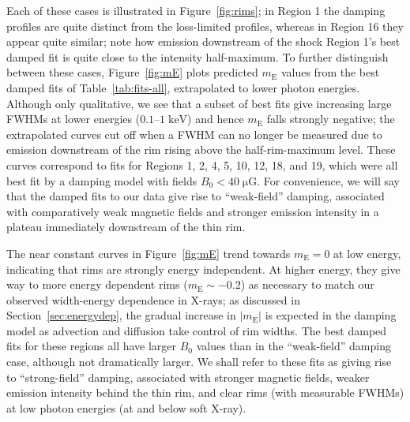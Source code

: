 \documentclass[iop, apj, numberedappendix]{emulateapj}
\newcommand*{\mt}{\mathrm}
\newcommand*{\unit}[1]{\;\mt{#1}}  %
\newcommand*{\mE}{m_\mt{E}}
\newcommand*{\muG}{\unit{\mu G}}
\begin{document}
Each of these cases is illustrated in Figure~\ref{fig:rims}; in Region 1 the
damping profiles are quite distinct from the loss-limited profiles, whereas in
Region 16 they appear quite similar; note how emission downstream of the shock
Region 1's best damped fit is quite close to the intensity half-maximum.  To
further distinguish between these cases, Figure~\ref{fig:mE} plots predicted
$\mE$ values from the best damped fits of Table~\ref{tab:fits-all},
extrapolated to lower photon energies.  Although only qualitative, we see that
a subset of best fits give increasing large FWHMs at lower energies ($0.1$--$1
\unit{keV}$) and hence $\mE$ falls strongly negative; the extrapolated curves
cut off when a FWHM can no longer be measured due to emission downstream of the
rim rising above the half-rim-maximum level.  These curves correspond to fits
for Regions 1, 2, 4, 5, 10, 12, 18, and 19, which were all best fit by a
damping model with fields $B_0 < 40 \muG$.  For convenience, we will say that
the damped fits to our data give rise to ``weak-field'' damping, associated
with comparatively weak magnetic fields and stronger emission intensity in a
plateau immediately downstream of the thin rim.

The near constant curves in Figure~\ref{fig:mE} trend towards $\mE = 0$ at low
energy, indicating that rims are strongly energy independent.  At higher
energy, they give way to more energy dependent rims ($\mE \sim -0.2$) as
necessary to match our observed width-energy dependence in X-rays; as discussed
in Section~\ref{sec:energydep}, the gradual increase in $|\mE|$ is expected in
the damping model as advection and diffusion take control of rim widths.
The best damped fits for these regions all have larger $B_0$ values than in the
``weak-field'' damping case, although not dramatically larger.  We shall refer
to these fits as giving rise to ``strong-field'' damping, associated with
stronger magnetic fields, weaker emission intensity behind the thin rim, and
clear rims (with measurable FWHMs) at low photon energies (at and below soft X-ray).
\end{document}
